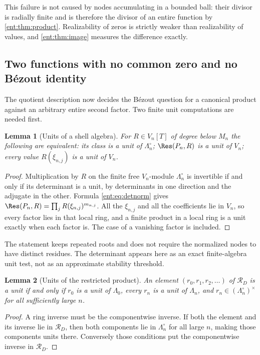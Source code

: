 \documentclass[11pt]{article}
\theoremstyle{plain}
\newtheorem{lemma}[lemma]{Lemma}
\theoremstyle{plain}
\theoremstyle{plain}
\theoremstyle{definition}
\theoremstyle{definition}
\theoremstyle{definition}
\theoremstyle{definition}
\theoremstyle{remark}
\newcommand{\RD}{\mathcal R_D}\newcommand{\Ucal}{\mathcal U}
\begin{document}
This failure is not caused by nodes accumulating in a bounded ball: their
divisor is radially finite and is therefore the divisor of an entire function
by \cref{ent:thm:product}. Realizability of zeros is strictly weaker than
realizability of values, and \cref{ent:thm:image} measures the difference
exactly.

\subsection{Two functions with no common zero and no B\'ezout identity}
\label{ent:subsec:no-bezout}
The quotient description now decides the B\'ezout question for a canonical
product against an arbitrary entire second factor. Two finite unit
computations are needed first.

\begin{lemma}[Units of a shell algebra]\label{ent:lem:shellunits}
For $R\in V_n[T]$ of degree below $M_n$ the following are equivalent:
its class is a unit of $\Lambda_n^\circ$; $\Res(P_n,R)$ is a unit of $V_n$;
every value $R(\xi_{n,j})$ is a unit of $V_n$.
\end{lemma}
\begin{proof}
Multiplication by $R$ on the finite free $V_n$-module $\Lambda_n^\circ$ is
invertible if and only if its determinant is a unit, by determinants in one
direction and the adjugate in the other. Formula \eqref{ent:eq:detnorm} gives
$\Res(P_n,R)=\prod_jR(\xi_{n,j})^{m_{n,j}}$. All the $\xi_{n,j}$ and all the
coefficients lie in $V_n$, so every factor lies in that local ring, and a
finite product in a local ring is a unit exactly when each factor is. The
case of a vanishing factor is included.
\end{proof}

The statement keeps repeated roots and does not require the normalized nodes
to have distinct residues. The determinant appears here as an exact
finite-algebra unit test, not as an approximate stability threshold.

\begin{lemma}[Units of the restricted product]\label{ent:lem:restrictedunits}
An element $(r_0,r_1,r_2,\ldots)$ of $\RD$ is a unit if and only if $r_0$ is a
unit of $\Lambda_0$, every $r_n$ is a unit of $\Lambda_n$, and
$r_n\in(\Lambda_n^\circ)^\times$ for all sufficiently large $n$.
\end{lemma}
\begin{proof}
A ring inverse must be the componentwise inverse. If both the element and its
inverse lie in $\RD$, then both components lie in $\Lambda_n^\circ$ for all
large $n$, making those components units there. Conversely those conditions
put the componentwise inverse in $\RD$.
\end{proof}
\end{document}
